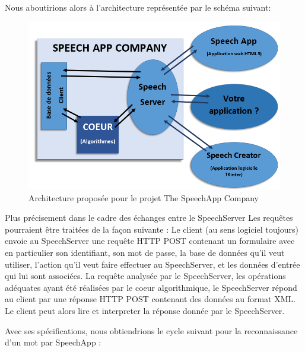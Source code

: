 \documentclass[a4paper,12pt]{report}
\begin{document}
\medskip

Nous aboutirions alors à l'architecture représentée par le schéma suivant:

\begin{figure}
	\begin{center}
	\includegraphics[width=14cm]{pics/architecture.png} 
	\end{center}
	\caption{Architecture proposée pour le projet The SpeechApp Company}
\end{figure}

Plus précisement dans le cadre des échanges entre le SpeechServer
Les requêtes pourraient être traitées de la façon suivante :
Le client (au sens logiciel toujours) envoie au SpeechServer une requête HTTP POST contenant un formulaire avec en particulier son identifiant, son mot de passe, la base de données qu'il veut utiliser, l'action qu'il veut faire effectuer au SpeechServer, et les données d'entrée qui lui sont associées.
La requête analysée par le SpeechServer, les opérations adéquates ayant été réalisées par le coeur algorithmique, le SpeechServer répond au client par une réponse HTTP POST contenant des données au format XML.
Le client peut alors lire et interpreter la réponse donnée par le SpeechServer.

\bigskip

Avec ses spécifications, nous obtiendrions le cycle suivant pour la reconnaissance d'un mot par SpeechApp :
\end{document}
